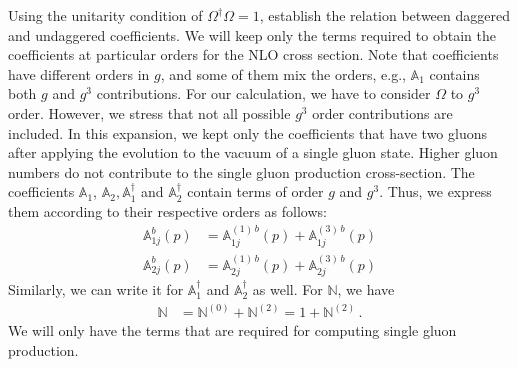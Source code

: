 \documentclass[10pt]{article}
\def\mf#1{\mathbb{#1}}
\numberwithin{equation}{section}
\begin{document}
Using the unitarity condition of $\Omega^{\dagger}\Omega = 1$, establish the relation between daggered and undaggered coefficients. We will keep only the terms required to obtain the coefficients at particular orders for the NLO cross section.
Note that coefficients have different orders in $g$, and some of them mix the orders, e.g., $\mf{A}_{1}$ contains both $g$ and $g^3$ contributions. For our calculation, we have to consider  $\Omega$ to $g^3$ order. However, we stress that not all possible $g^3$ order contributions are included. In this expansion, we kept only the coefficients that have two gluons after applying the evolution to the vacuum of a single gluon state. Higher gluon numbers do not contribute to the single gluon production cross-section. The coefficients $\mf{A}_{1}$, $\mf{A}_{2}, \mf{A}^{\dagger}_{1}$ and $\mf{A}^{\dagger}_{2}$ contain terms of order $g$ and $g^{3}$.  Thus, we express them according to their respective orders as follows:
\begin{align}
    \mf{A}^{b}_{1j}(p) &=  \mf{A}^{(1)\, b}_{1j}(p) +  \mf{A}^{(3)\, b}_{1j}(p)\\ 
    \mf{A}^{b}_{2j}(p) &=  \mf{A}^{(1)\, b}_{2j}(p) +  \mf{A}^{(3)\, b}_{2j}(p)
\end{align}
Similarly, we can write it for $\mf{A}^{\dagger}_{1}$ and $\mf{A}^{\dagger}_{2}$ as well.
For $\mf{N}$, we have 
\begin{align}
    \mf{N}  &=  \mf{N}^{(0)} +  \mf{N}^{(2)} = 1 +  \mf{N}^{(2)}\,. 
\end{align}
We will only have the terms that are required for computing single gluon production. 
\end{document}
